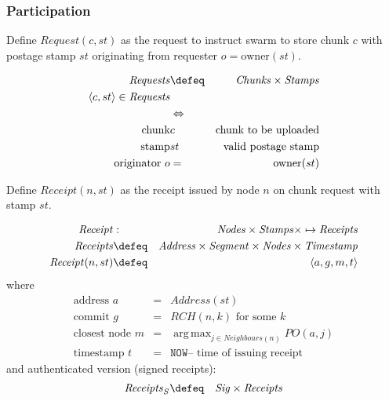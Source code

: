
\subsubsection{Participation}

\begin{definition}
\label{def:push-sync-request}
Define  $\mathit{Request}(c,st)$ as the request  to instruct swarm to store chunk $c$ with postage stamp $st$ originating from requester $o=\mathrm{owner}(st)$. 

\begin{eqnarray}
\mathit{Requests}&\defeq&\mathit{Chunks}\times\mathit{Stamps}\\ 
\langle c, st\rangle\in\mathit{Requests} \\
&\Leftrightarrow&\\
\text{chunk}&c&\text{chunk to be uploaded}\\
\text{stamp}&st&\text{valid postage stamp}\\
\text{originator } o&=&\mathrm{owner}(st)
\end{eqnarray}
\end{definition}

\begin{definition}
\label{def:receipt}
Define  $\mathit{Receipt}(n,st)$ as the receipt issued by node $n$ on chunk request with stamp $st$.

\begin{eqnarray}
\mathit{Receipt}&:&\mathit{Nodes}\times\mathit{Stamps}\times\mapsto\mathit{Receipts}\\ 
\mathit{Receipts} &\defeq&
\mathit{Address}\times\mathit{Segment}\times\mathit{Nodes}\times\mathit{Timestamp}\\
\mathit{Receipt}(n, st) &\defeq& \langle
a, g, m, t \rangle
\end{eqnarray}
where
\begin{eqnarray}
\text{address } a&=&\mathit{Address}(st)\\
\text{commit } g&=&\mathit{RCH}(n,k) \text{ for some }k\\
\text{closest node } m&=&\operatorname{arg\,max}_{j\in\mathit{Neighbours}(n)}\mathit{PO}(a,j)\\
\text{timestamp } t&=&\texttt{NOW} \text{-- time of issuing receipt}
\end{eqnarray}
and authenticated version (signed receipts):
\begin{eqnarray}
\mathit{Receipts}_S &\defeq&\mathit{Sig}\times\mathit{Receipts}
 \end{eqnarray}

\end{definition}

